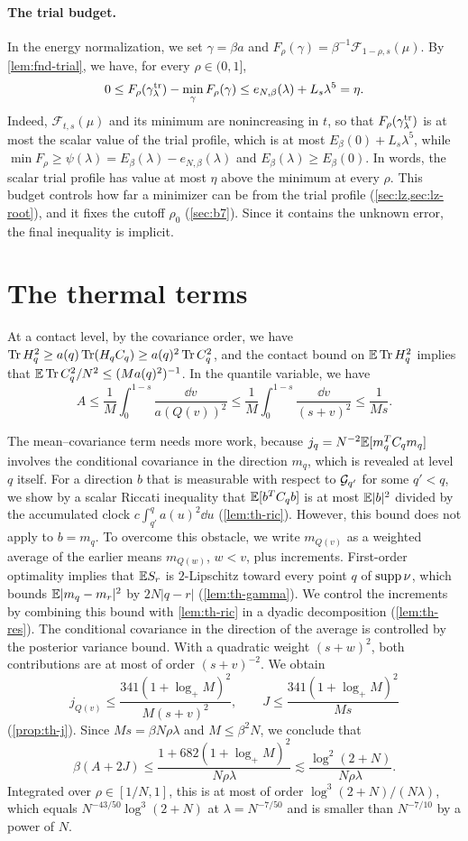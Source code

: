 \paragraph{The trial budget.}
In the energy normalization, we set $\gamma=\beta a$ and
$F_\rho(\gamma)=\beta^{-1}\mathcal F_{1-\rho,s}(\mu)$. By
\cref{lem:fnd-trial}, we have, for every $\rho\in(0,1]$,
\[
 0\le F_\rho(\gamma^{\rm tr}_\lambda)-\min_\gamma F_\rho(\gamma)
 \le e_{N,\beta}(\lambda)+L_s\lambda^5=\eta .
\]
Indeed, $\mathcal F_{t,s}(\mu)$ and its minimum are nonincreasing in
$t$, so that $F_\rho(\gamma^{\rm tr}_\lambda)$ is at most the scalar
value of the trial profile, which is at most $E_\beta(0)+L_s\lambda^5$,
while $\min F_\rho\ge\psi(\lambda)=E_\beta(\lambda)-e_{N,\beta}(\lambda)$
and $E_\beta(\lambda)\ge E_\beta(0)$. In words, the scalar trial profile has value at most $\eta$ above the minimum at every $\rho$. This budget controls
how far a minimizer can be from the trial profile
(\cref{sec:lz,sec:lz-root}), and it fixes the cutoff $\rho_0$
(\cref{sec:b7}). Since it contains the unknown error, the final inequality
is implicit.

\section{The thermal terms}\label{sec:overview-thermal}

At a contact level, by the covariance order, we have
$\operatorname{Tr} H_q^2\ge a(q)\operatorname{Tr}(H_qC_q)\ge a(q)^2\operatorname{Tr} C_q^2$, and the contact bound
on $\mathbb E\operatorname{Tr} H_q^2$ implies that $\mathbb E\operatorname{Tr} C_q^2/N^2\le(Ma(q)^2)^{-1}$. In
the quantile variable, we have
\[
 A\le\frac1M\int_0^{1-s}\frac{\dd v}{a(Q(v))^2}
 \le\frac1M\int_0^{1-s}\frac{\dd v}{(s+v)^2}\le\frac1{Ms}.
\]

The mean--covariance term needs more work, because
$j_q=N^{-2}\mathbb E[m_q^TC_qm_q]$ involves the conditional covariance in the
direction $m_q$, which is revealed at level $q$ itself. For a
direction $b$ that is measurable with respect to $\mathcal G_{q'}$ for some
$q'<q$, we show by a scalar Riccati inequality that $\mathbb E[b^TC_qb]$ is at most
$\mathbb E|b|^2$ divided by the accumulated clock $c\int_{q'}^qa(u)^2\dd u$
(\cref{lem:th-ric}). However, this bound does not apply to $b=m_q$. To
overcome this obstacle, we write $m_{Q(v)}$ as a weighted average of
the earlier means $m_{Q(w)}$, $w<v$, plus increments. First-order
optimality implies that $\mathbb E S_r$ is $2$-Lipschitz toward every point
$q$ of $\operatorname{supp}\nu$, which bounds $\mathbb E|m_q-m_r|^2$ by $2N|q-r|$
(\cref{lem:th-gamma}). We control the increments by combining this
bound with \cref{lem:th-ric} in a dyadic decomposition (\cref{lem:th-res}).
The conditional covariance in the direction of the average is
controlled by the posterior variance bound. With a quadratic weight
$(s+w)^2$, both contributions are at most of order $(s+v)^{-2}$. We obtain
\[
 j_{Q(v)}\le\frac{341(1+\log_+M)^2}{M(s+v)^2},\qquad
 J\le\frac{341(1+\log_+M)^2}{Ms}
\]
(\cref{prop:th-j}).
Since $Ms=\beta N\rho\lambda$ and $M\le\beta^2N$, we conclude that
\[
 \beta(A+2J)\le\frac{1+682(1+\log_+M)^2}{N\rho\lambda}
 \lesssim\frac{\log^2(2+N)}{N\rho\lambda}.
\]
Integrated over $\rho\in[1/N,1]$, this is at most of order
$\log^3(2+N)/(N\lambda)$, which equals $N^{-43/50}\log^3(2+N)$ at
$\lambda=N^{-7/50}$ and is smaller than $N^{-7/10}$ by a power of $N$.

